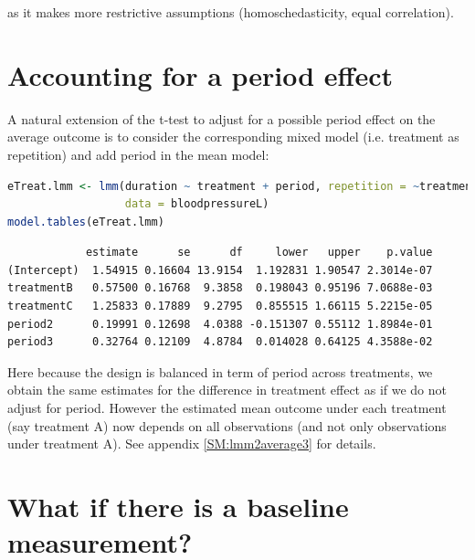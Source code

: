 \documentclass[12pt]{article}
\begin{document}
as it makes more restrictive assumptions (homoschedasticity, equal
correlation).

\clearpage
\section{Accounting for a period effect}
\label{sec:org39483fe}

A natural extension of the t-test to adjust for a possible period
effect on the average outcome is to consider the corresponding mixed
model (i.e. treatment as repetition) and add period in the mean model:
\begin{lstlisting}[language=r,numbers=none]
eTreat.lmm <- lmm(duration ~ treatment + period, repetition = ~treatment|id,
                  data = bloodpressureL)
model.tables(eTreat.lmm)
\end{lstlisting}

\label{}
\begin{verbatim}
            estimate      se      df     lower   upper    p.value
(Intercept)  1.54915 0.16604 13.9154  1.192831 1.90547 2.3014e-07
treatmentB   0.57500 0.16768  9.3858  0.198043 0.95196 7.0688e-03
treatmentC   1.25833 0.17889  9.2795  0.855515 1.66115 5.2215e-05
period2      0.19991 0.12698  4.0388 -0.151307 0.55112 1.8984e-01
period3      0.32764 0.12109  4.8784  0.014028 0.64125 4.3588e-02
\end{verbatim}



Here because the design is balanced in term of period across
treatments, we obtain the same estimates for the difference in
treatment effect as if we do not adjust for period. However the
estimated mean outcome under each treatment (say treatment A) now
depends on all observations (and not only observations under treatment
A). See appendix \ref{SM:lmm2average3} for details.

\clearpage
\section{What if there is a baseline measurement?}
\label{sec:org46a644a}
\end{document}
